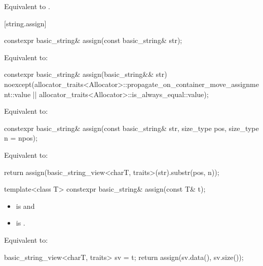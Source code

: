 \begin{itemdescr}
\pnum
\effects
Equivalent to
.
\end{itemdescr}

[string.assign]{}

%
\begin{itemdecl}
constexpr basic_string& assign(const basic_string& str);
\end{itemdecl}

\begin{itemdescr}
\pnum
\effects
Equivalent to: 
\end{itemdescr}

%
\begin{itemdecl}
constexpr basic_string& assign(basic_string&& str)
  noexcept(allocator_traits<Allocator>::propagate_on_container_move_assignment::value ||
           allocator_traits<Allocator>::is_always_equal::value);
\end{itemdecl}

\begin{itemdescr}
\pnum
\effects
Equivalent to: 
\end{itemdescr}


%
\begin{itemdecl}
constexpr basic_string& assign(const basic_string& str, size_type pos, size_type n = npos);
\end{itemdecl}

\begin{itemdescr}
\pnum
\effects
Equivalent to:
\begin{codeblock}
return assign(basic_string_view<charT, traits>(str).substr(pos, n));
\end{codeblock}
\end{itemdescr}

%
\begin{itemdecl}
template<class T>
  constexpr basic_string& assign(const T& t);
\end{itemdecl}

\begin{itemdescr}
\pnum
\constraints
\begin{itemize}
\item
{} is
 and
\item
{} is
.
\end{itemize}

\pnum
\effects
Equivalent to:
\begin{codeblock}
basic_string_view<charT, traits> sv = t;
return assign(sv.data(), sv.size());
\end{codeblock}
\end{itemdescr}

